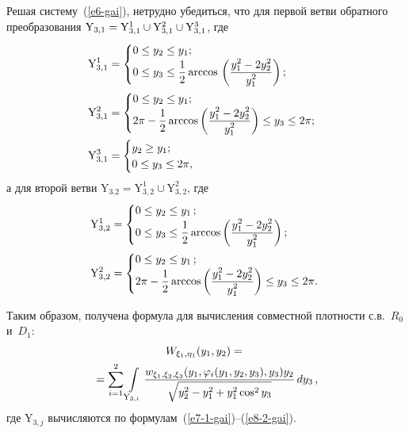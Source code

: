 \begin{multicols}{2}
  Решая систему~(\ref{e6-gai}), нетрудно убедиться, что для первой ветви
обратного преобразования  $\mathrm{Y}_{3,1}\hm= \mathrm{Y}_{3,1}^1\cup
\mathrm{Y}_{3,1}^2\cup \mathrm{Y}_{3,1}^3$, где
  \begin{align}
  \hspace*{-2mm}\mathrm{Y}_{3,1}^1 &=\begin{cases}
  0\leq y_2\leq y_1;\\
  0\leq y_3\leq \fr{1}{2}\,\mathrm{arccos}\,\left( \fr{y_1^2-
2y_2^2}{y_1^2}\right);\end{cases}
  \label{e7-1-gai}
\\
\hspace*{-2mm}\mathrm{Y}_{3,1}^2 &= \begin{cases}
  0\leq y_2\leq y_1;\\
  2\pi -\fr{1}{2}\,\mathrm{arccos}\left( \fr{y_1^2-2y_2^2}{y_1^2}\right) \leq
y_3\leq 2\pi;
  \end{cases}\!\!\!\!\!
  \label{e7-2-gai}
  \\
\hspace*{-2mm}\mathrm{Y}_{3,1}^3 &= \begin{cases}
  y_2\geq y_1;\\
  0\leq y_3\leq 2\pi,
  \end{cases}\!\!\!\!\!\!\!\!\!
  \label{e7-3-gai}
  \end{align}
а для второй ветви  $\mathrm{Y}_{3.2}=\mathrm{Y}_{3,2}^1\cup
\mathrm{Y}_{3,2}^2$, где
\begin{align}
\label{e8-1-gai}
\hspace*{-2mm}\mathrm{Y}_{3,2}^1 &= \begin{cases}
0\leq y_2\leq y_1\,;\\
0\leq y_3\leq \fr{1}{2}\,\mathrm{arccos}\left( \fr{y_1^2-2y_2^2}{y_1^2}\right);
\end{cases}
\\
\hspace*{-2mm}\mathrm{Y}_{3,2}^2 &=\begin{cases}
0\leq y_2\leq y_1\,;\\
2\pi -\fr{1}{2}\,\mathrm{arccos} \left( \fr{y_1^2-2y_2^2}{y_1^2}\right) \leq y_3\leq
2\pi.\!\!\!\!\!\!\!\!
\end{cases}
\label{e8-2-gai}
\end{align}

  Таким образом, получена формула для вычисления совместной плотности
с.в.~$R_0$ и~$D_1$:
  \begin{multline}
  W_{\xi_1,\eta_1}(y_1,y_2) ={}\\
  {}=\sum\limits_{i=1}^2 \int\limits_{\mathrm{Y}_{3,i}}
\displaystyle\frac{\displaystyle w_{\xi_1,\xi_2,\xi_3} (y_1,\varphi_i(y_1,y_2,y_3),y_3) y_2\mathstrut}{\displaystyle \sqrt{y_2^2-
y_1^2+y_1^2\cos^2 y_3}\mathstrut}\,dy_3\,,
  \label{e9-gai}
  \end{multline}
где $\mathrm{Y}_{3,j}$ вычисляются по
формулам~(\ref{e7-1-gai})--(\ref{e8-2-gai}).


\end{multicols}
